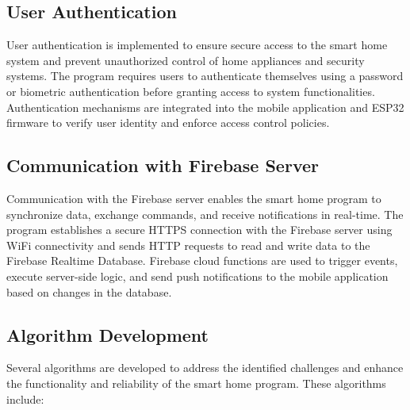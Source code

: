 \subsection{User Authentication}
User authentication is implemented to ensure secure access to the smart home system and prevent unauthorized control of home appliances and security systems. The program requires users to authenticate themselves using a password or biometric authentication before granting access to system functionalities. Authentication mechanisms are integrated into the mobile application and ESP32 firmware to verify user identity and enforce access control policies.

\subsection{Communication with Firebase Server}
Communication with the Firebase server enables the smart home program to synchronize data, exchange commands, and receive notifications in real-time. The program establishes a secure HTTPS connection with the Firebase server using WiFi connectivity and sends HTTP requests to read and write data to the Firebase Realtime Database. Firebase cloud functions are used to trigger events, execute server-side logic, and send push notifications to the mobile application based on changes in the database.

\subsection{Algorithm Development}
Several algorithms are developed to address the identified challenges and enhance the functionality and reliability of the smart home program. These algorithms include:

